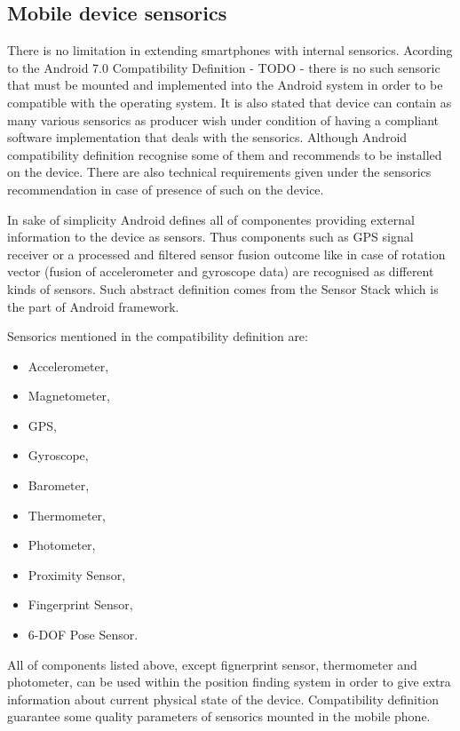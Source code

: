 \documentclass[../main.tex]{subfiles}
\begin{document}
\subsection{Mobile device sensorics}

There is no limitation in extending smartphones with internal sensorics. Acording to the Android 7.0 Compatibility Definition - TODO - there is no such sensoric that must be mounted and implemented into the Android system in order to be compatible with the operating system. It is also stated that device can contain as many various sensorics as producer wish under condition of having a compliant software implementation that deals with the sensorics. Although Android compatibility definition recognise some of them and recommends to be installed on the device. There are also technical requirements given under the sensorics recommendation in case of presence of such on the device.

In sake of simplicity Android defines all of componentes providing external information to the device as sensors. Thus components such as GPS signal receiver or a processed and filtered sensor fusion outcome like in case of rotation vector (fusion of accelerometer and gyroscope data) are recognised as different kinds of sensors. Such abstract definition comes from the Sensor Stack which is the part of Android framework.

Sensorics mentioned in the compatibility definition are:
\begin{itemize}
 	\item Accelerometer,
	\item Magnetometer,
	\item GPS,
	\item Gyroscope,
	\item Barometer,
	\item Thermometer,
	\item Photometer,
	\item Proximity Sensor,
	\item Fingerprint Sensor,
	\item 6-DOF Pose Sensor.
 \end{itemize}

All of components listed above, except fignerprint sensor, thermometer and photometer, can be used within the position finding system in order to give extra information about current physical state of the device. Compatibility definition guarantee some quality parameters of sensorics mounted in the mobile phone.
\end{document}
